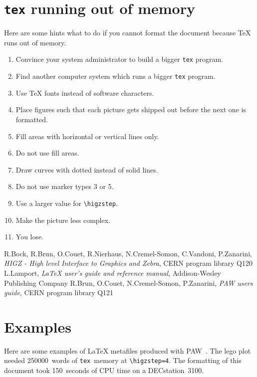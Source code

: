 \section{{\tt tex} running out of memory}

Here are some hints what to do if you cannot format the document
because \TeX{} runs out of memory.

\begin{enumerate}
\item 
Convince your system administrator to build a bigger {\tt tex} program.
\item 
Find another computer system which runs a bigger {\tt tex} program.
\item 
Use \TeX{} fonts instead of software characters.
\item 
Place figures such that each picture gets shipped out before the next one
is formatted.
\item 
Fill areas with horizontal or vertical lines only.
\item 
Do not use fill areas.
\item 
Draw curves with dotted instead of solid lines.
\item 
Do not use marker types 3 or 5.
\item 
Use a larger value for \verb'\higzstep'.
\item 
Make the picture less complex.
\item
You lose.
\end{enumerate}

\begin{thebibliography}{1}
R.Bock, R.Brun, O.Couet, R.Nierhaus, N.Cremel-Somon, C.Vandoni, P.Zanarini,
{\em HIGZ - High level Interface to Graphics and Zebra},
CERN program library Q120
L.Lamport,
{\em \LaTeX{} user's guide and reference manual},
Addison-Wesley Publishing Company
R.Brun, O.Couet, N.Cremel-Somon, P.Zanarini,
{\em PAW users guide},
CERN program library Q121
\end{thebibliography}

\appendix

\section{Examples}

Here are some examples of \LaTeX{} metafiles produced with PAW~\cite{PAW}.
The lego plot needed 250000~words of {\tt tex}~memory at \verb'\higzstep=4'.
The formatting of this document took 150~seconds of CPU time
on a DECstation~3100.

